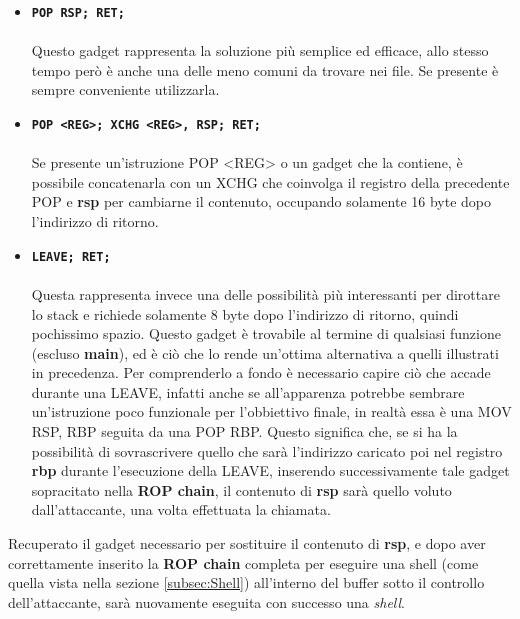 \begin{itemize}
    \item \texttt{\large{\textbf{\textcolor{Bittersweet}{POP}  \space  RSP; \space \textcolor{Bittersweet}{RET};}}}\\\\
    Questo gadget rappresenta la soluzione più semplice ed efficace, allo stesso tempo però è anche una delle meno comuni da trovare nei file. Se presente è sempre conveniente utilizzarla.
    \item \texttt{\large{\textbf{\textcolor{Bittersweet}{POP}  \space  <REG>; \space \textcolor{Bittersweet}{XCHG}  \space  <REG>, RSP; \space \textcolor{Bittersweet}{RET};}}}\\\\
    Se presente un'istruzione POP <REG> o un gadget che la contiene, è possibile concatenarla con un XCHG che coinvolga il registro della precedente POP e \textbf{rsp} per cambiarne il contenuto, occupando solamente 16 byte dopo l'indirizzo di ritorno.
    \item \texttt{\large{\textbf{\textcolor{Bittersweet}{LEAVE}; \space \textcolor{Bittersweet}{RET};}}}\\\\
    Questa rappresenta invece una delle possibilità più interessanti per dirottare lo stack e richiede solamente 8 byte dopo l'indirizzo di ritorno, quindi pochissimo spazio. Questo gadget è trovabile al termine di qualsiasi funzione (escluso \textbf{main}), ed è ciò che lo rende un'ottima alternativa a quelli illustrati in precedenza.
    Per comprenderlo a fondo è necessario capire ciò che accade durante una LEAVE, infatti anche se all'apparenza potrebbe sembrare un'istruzione poco funzionale per l'obbiettivo finale, in realtà essa è una MOV RSP, RBP seguita da una POP RBP. Questo significa che, se si ha la possibilità di sovrascrivere quello che sarà l'indirizzo
    caricato poi nel registro \textbf{rbp} durante l'esecuzione della LEAVE, inserendo successivamente tale gadget sopracitato nella \textbf{ROP chain}, il contenuto di \textbf{rsp} sarà quello voluto dall'attaccante, una volta effettuata la chiamata.
\end{itemize}
Recuperato il gadget necessario per sostituire il contenuto di \textbf{rsp}, e dopo aver correttamente inserito la \textbf{ROP chain} completa per eseguire una shell (come quella vista nella sezione \ref{subsec:Shell}) all'interno del buffer sotto il controllo dell'attaccante, sarà nuovamente eseguita con successo una \textit{shell}.

